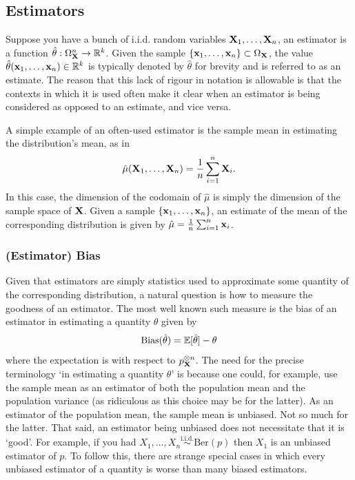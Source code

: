 \documentclass[11pt]{article}
\begin{document}
\begin{appendices}
\subsection{Estimators}
Suppose you have a bunch of i.i.d. random variables $\mathbf{X}_1,\dots,\mathbf{X}_n$, an estimator is a function $\hat{\theta}:\Omega_{\mathbf{X}}^n\to\mathbb{R}^k$. Given the sample $\{\mathbf{x}_1,\dots,\mathbf{x}_n\}\subset\Omega_{\mathbf{X}}$, the value $\hat{\theta}(\mathbf{x}_1,\dots,\mathbf{x}_n)\in\mathbb{R}^k$ is typically denoted by $\hat{\theta}$ for brevity and is referred to as an estimate. The reason that this lack of rigour in notation is allowable is that the contexts in which it is used often make it clear when an estimator is being considered as opposed to an estimate, and vice versa.

A simple example of an often-used estimator is the sample mean in estimating the distribution's mean, as in
$$
\hat{\mu}(\mathbf{X}_1,\dots,\mathbf{X}_n)
=
\frac{1}{n}\sum_{i=1}^n \mathbf{X}_i.
$$
In this case, the dimension of the codomain of $\hat{\mu}$ is simply the dimension of the sample space of $\mathbf{X}$. Given a sample $\{\mathbf{x}_1,\dots,\mathbf{x}_n\}$, an estimate of the mean of the corresponding distribution is given by $\hat{\mu}=\frac{1}{n}\sum_{i=1}^n\mathbf{x}_i$.

\subsubsection{(Estimator) Bias}
Given that estimators are simply statistics used to approximate some quantity of the corresponding distribution, a natural question is how to measure the goodness of an estimator. The most well known such measure is the bias of an estimator in estimating a quantity $\theta$ given by
$$
\text{Bias}(\hat{\theta})
=
\mathbb{E}[\hat{\theta}]-\theta
$$
where the expectation is with respect to $p_{\mathbf{X}}^{{\otimes}n}$. The need for the precise terminology `in estimating a quantity $\theta$' is because one could, for example, use the sample mean as an estimator of both the population mean and the population variance (as ridiculous as this choice may be for the latter). As an estimator of the population mean, the sample mean is unbiased. Not so much for the latter. That said, an estimator being unbiased does not necessitate that it is `good'. For example, if you had $X_1,\dots,X_n\overset{\text{i.i.d.}}{\sim}\text{Ber}(p)$ then $X_1$ is an unbiased estimator of $p$. To follow this, there are strange special cases in which every unbiased estimator of a quantity is worse than many biased estimators.


\end{appendices}
\end{document}
